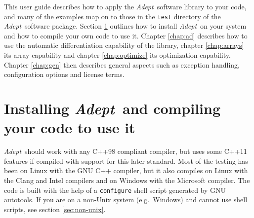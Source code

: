 \documentclass[a4,oneside]{book}
\def\codesize{\small}
\def\Adept{\emph{Adept}}
\def\code#1{{\codesize\texttt{#1}}}
\begin{document}
This user guide describes how to apply the \Adept\ software library to
your code, and many of the examples map on to those in the \code{test}
directory of the \Adept\ software package.  Section
\ref{sec:installing} outlines how to install \Adept\ on your system
and how to compile your own code to use it. Chapter \ref{chap:ad}
describes how to use the automatic differentiation capability of the
library, chapter \ref{chap:arrays} its array capability and chapter
\ref{chap:optimize} its optimization capability. Chapter
\ref{chap:gen} then describes general aspects such as exception
handling, configuration options and license terms.

\section{Installing \Adept\ and compiling your code to use it}
\label{sec:installing}
\Adept\ should work with any C++98 compliant compiler, but uses some
C++11 features if compiled with support for this later standard. Most
of the testing has been on Linux with the GNU C++ compiler, but it
also compiles on Linux with the Clang and Intel compilers and on
Windows with the Microsoft compiler. The code is built with the help
of a \code{configure} shell script generated by GNU autotools.  If you
are on a non-Unix system (e.g.\ Windows) and cannot use shell scripts,
see section \ref{sec:non-unix}.
\end{document}

